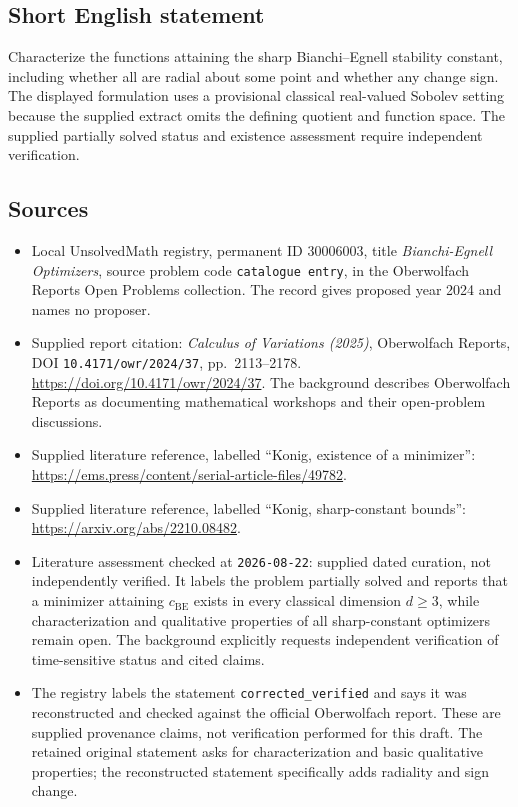 \documentclass[11pt]{article}
\begin{document}
\subsection{Short English statement}
Characterize the functions attaining the sharp Bianchi--Egnell stability constant, including whether all are radial about some point and whether any change sign. The displayed formulation uses a provisional classical real-valued Sobolev setting because the supplied extract omits the defining quotient and function space. The supplied partially solved status and existence assessment require independent verification.
\subsection{Sources}
\begin{itemize}
\item Local UnsolvedMath registry, permanent ID \(30006003\), title \emph{Bianchi-Egnell Optimizers}, source problem code \texttt{catalogue entry}, in the Oberwolfach Reports Open Problems collection. The record gives proposed year 2024 and names no proposer.
\item Supplied report citation: \emph{Calculus of Variations (2025)}, Oberwolfach Reports, DOI \texttt{10.4171/owr/2024/37}, pp.\ 2113--2178. \url{https://doi.org/10.4171/owr/2024/37}. The background describes Oberwolfach Reports as documenting mathematical workshops and their open-problem discussions.
\item Supplied literature reference, labelled ``Konig, existence of a minimizer'': \url{https://ems.press/content/serial-article-files/49782}.
\item Supplied literature reference, labelled ``Konig, sharp-constant bounds'': \url{https://arxiv.org/abs/2210.08482}.
\item Literature assessment checked at \texttt{2026-08-22}: supplied dated curation, not independently verified. It labels the problem partially solved and reports that a minimizer attaining \(c_{\mathrm{BE}}\) exists in every classical dimension \(d\geq3\), while characterization and qualitative properties of all sharp-constant optimizers remain open. The background explicitly requests independent verification of time-sensitive status and cited claims.
\item The registry labels the statement \texttt{corrected\_verified} and says it was reconstructed and checked against the official Oberwolfach report. These are supplied provenance claims, not verification performed for this draft. The retained original statement asks for characterization and basic qualitative properties; the reconstructed statement specifically adds radiality and sign change.
\end{itemize}
\end{document}
